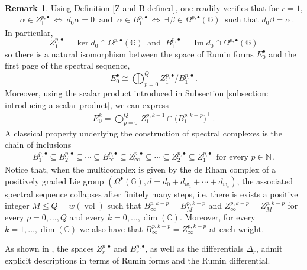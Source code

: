 \documentclass[dvipsnames]{amsart}
\theoremstyle{definition}
\newtheorem{remark}[theorem]{Remark}
\theoremstyle{definition}
\numberwithin{equation}{section}
\newcommand{\N}{\mathbb{N}}
\newcommand{\G}{\mathbb{G}}
\begin{document}
\begin{remark}
    Using Definition \ref{Z and B defined}, one readily verifies that for $r=1$,
    \begin{align*}
        &\alpha\in Z_1^{p,\bullet}\ \Longleftrightarrow\ d_0\alpha=0\ \text{ and }\ \alpha\in B_1^{p,\bullet}\ \Longleftrightarrow\ \exists\, \beta\in\Omega^{p,\bullet}(\G)\ \text{ such that }d_0\beta=\alpha \,.
    \end{align*}
    In particular, $$Z_1^{p,\bullet}=\ker d_0\cap\Omega^{p,\bullet}(\G)\ \text{ and }\ B_1^{p,\bullet}=\operatorname{Im}d_0\cap\Omega^{p,\bullet}(\G)$$
    so there is a natural isomorphism between the space of Rumin forms $E_0^\bullet$ and the first page of the spectral sequence, $$E_0^\bullet\cong\bigoplus_{p=0}^QZ_1^{p,\bullet}/B_1^{p,\bullet}\,.$$ Moreover, using the scalar product introduced in Subsection \ref{subsection: introducing a scalar product}, we can express
    \begin{align*}
        E_0^k=\bigoplus_{p=0}^Q\,Z_1^{p,k-1}\cap\big(B_1^{p,k-p}\big)^\perp\,.
    \end{align*}
    A classical property underlying the  construction of spectral complexes is the chain of inclusions
    \begin{align*}
        B_1^{p,\bullet}\subseteq B_2^{p,\bullet}\subseteq\cdots\subseteq B_\infty^{p,\bullet}\subseteq Z_\infty^{p,\bullet}\subseteq\cdots\subseteq Z_2^{p,\bullet}\subseteq Z_1^{p,\bullet}\ \text{ for every }p\in\N\,.
    \end{align*}
    Notice that, when the multicomplex is given by the de Rham complex of a positively graded Lie group $(\Omega^\bullet(\G),d=d_0+d_{w_1}+\cdots+d_{w_s})$, the associated spectral sequence collapses after finitely many steps, i.e. there is exists a positive integer $M\le Q=w(\operatorname{vol})$ such that $B_\infty^{p,k-p}=B_M^{p,k-p}$ and $Z_\infty^{p,k-p}=Z_M^{p,k-p}$ for every $p=0,\ldots,Q$ and every $k=0,\ldots,\operatorname{dim}(\G)$. Moreover, for every $k=1,\ldots,\operatorname{dim}(\G)$ we also have that $B_\infty^{p,k-p}=Z_\infty^{p,k-p}$ at each weight.
\end{remark}
As shown in \cite{tripaldi2026spectralcomplexestruncatedmulticomplexes}, the spaces $Z_r^{p,\bullet}$ and $B_r^{p,\bullet}$, as well as the differentials $\Delta_r$, admit explicit descriptions in terms of Rumin forms and the Rumin differential.
\end{document}
